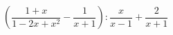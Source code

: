 \begin{ex}[type=expression]
	\begin{condition}
		\( \left( \dfrac{1+x}{1-2x+x^2}-\dfrac{1}{x+1} \right):\dfrac{x}{x-1}+\dfrac{2}{x+1} \)
	\end{condition}
\end{ex}